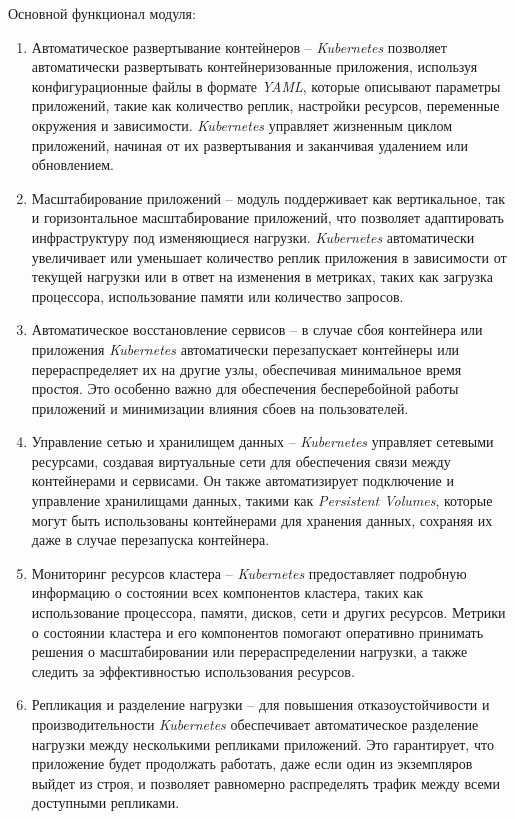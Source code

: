 Основной функционал модуля:

\begin{enumerate}
    \item Автоматическое развертывание контейнеров -- \textit{Kubernetes} позволяет автоматически развертывать контейнеризованные приложения, используя конфигурационные файлы в формате \textit{YAML}, которые описывают параметры приложений, такие как количество реплик, настройки ресурсов, переменные окружения и зависимости. \textit{Kubernetes} управляет жизненным циклом приложений, начиная от их развертывания и заканчивая удалением или обновлением.
    \item Масштабирование приложений -- модуль поддерживает как вертикальное, так и горизонтальное масштабирование приложений, что позволяет адаптировать инфраструктуру под изменяющиеся нагрузки. \textit{Kubernetes} автоматически увеличивает или уменьшает количество реплик приложения в зависимости от текущей нагрузки или в ответ на изменения в метриках, таких как загрузка процессора, использование памяти или количество запросов.
    \item Автоматическое восстановление сервисов -- в случае сбоя контейнера или приложения \textit{Kubernetes} автоматически перезапускает контейнеры или перераспределяет их на другие узлы, обеспечивая минимальное время простоя. Это особенно важно для обеспечения бесперебойной работы приложений и минимизации влияния сбоев на пользователей.
    \item Управление сетью и хранилищем данных -- \textit{Kubernetes} управляет сетевыми ресурсами, создавая виртуальные сети для обеспечения связи между контейнерами и сервисами. Он также автоматизирует подключение и управление хранилищами данных, такими как \textit{Persistent Volumes}, которые могут быть использованы контейнерами для хранения данных, сохраняя их даже в случае перезапуска контейнера.
    \item Мониторинг ресурсов кластера -- \textit{Kubernetes} предоставляет подробную информацию о состоянии всех компонентов кластера, таких как использование процессора, памяти, дисков, сети и других ресурсов. Метрики о состоянии кластера и его компонентов помогают оперативно принимать решения о масштабировании или перераспределении нагрузки, а также следить за эффективностью использования ресурсов.
    \item Репликация и разделение нагрузки -- для повышения отказоустойчивости и производительности \textit{Kubernetes} обеспечивает автоматическое разделение нагрузки между несколькими репликами приложений. Это гарантирует, что приложение будет продолжать работать, даже если один из экземпляров выйдет из строя, и позволяет равномерно распределять трафик между всеми доступными репликами.

\end{enumerate}
